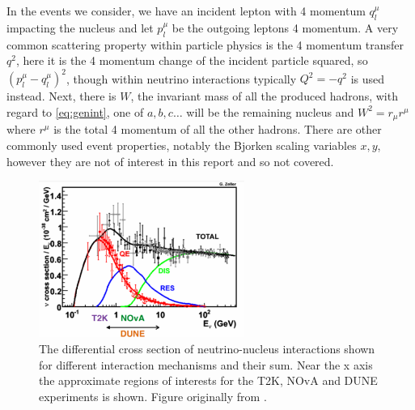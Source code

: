 \documentclass[a4paper,12pt]{article}
\begin{document}
In the events we consider, we have an incident lepton with 4 momentum $q_{l}^\mu$ impacting the nucleus and let $p_l^\mu$ be the outgoing leptons 4 momentum.
A very common scattering property within particle physics is the 4 momentum transfer $q^2$, here it is the 4 momentum change of the incident particle squared, so $(p_l^\mu - q_l^\mu)^2$, though within neutrino interactions typically $Q^2 = -q^2$ is used instead.
Next, there is $W$, the invariant mass of all the produced hadrons, with regard to \cref{eq:genint}, one of $a, b, c \ldots$ will be the remaining nucleus and $W^2 = r_\mu r^\mu$ where $r^\mu$ is the total 4 momentum of all the other hadrons.
There are other commonly used event properties, notably the Bjorken scaling variables $x, y$, however they are not of interest in this report and so not covered.

\begin{figure}[H]
    \centering
    \includegraphics[width=0.6\textwidth]{figures/sigmaVsEnu.pdf}
    \caption{
        The differential cross section of neutrino-nucleus interactions shown for different interaction mechanisms and their sum.
        Near the x axis the approximate regions of interests for the T2K, NOvA and DUNE experiments is shown.
        Figure originally from \cite{formaggioEVEeVNeutrino2012}.
    }\label{fig:nusigma_vs_Enu}
\end{figure}
\end{document}
